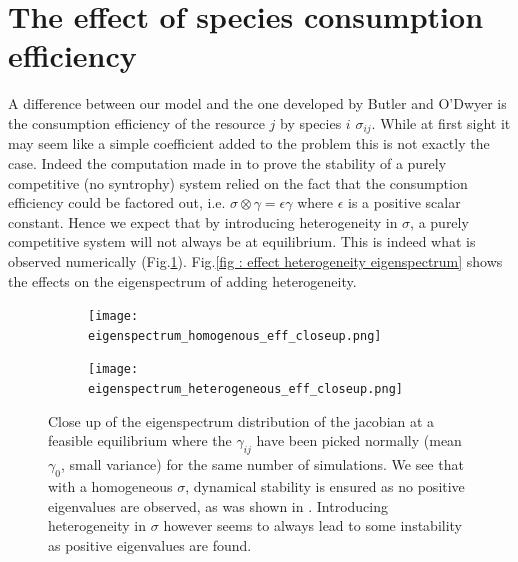 \documentclass[12pt, titlepage]{report}
\begin{document}
	\clearpage
	\section{The effect of species consumption efficiency}
	A difference between our model and the one developed by Butler and O'Dwyer \cite{Butler:2018aa} is the consumption efficiency of the resource $j$ by species $i$ $\sigma_{ij}$. While at first sight it may seem like a simple coefficient added to the problem this is not exactly the case. Indeed the computation made in \cite{Butler:2018aa} to prove the stability of a purely competitive (no syntrophy) system relied on the fact that the consumption efficiency could be factored out, i.e. $\sigma \otimes \gamma  = \epsilon \gamma$ where $\epsilon$ is a positive scalar constant. Hence we expect that by introducing heterogeneity in $\sigma$, a purely competitive system will not always be at equilibrium. This is indeed what is observed numerically (Fig.\ref{fig : effect heterogeneity stability}). Fig.\ref{fig : effect heterogeneity eigenspectrum} shows the effects on the eigenspectrum of adding heterogeneity.
	\begin{figure}[h!]
		\centering
		\begin{subfigure}{0.49\textwidth}
			\texttt{[image: eigenspectrum\_homogenous\_eff\_closeup.png]}
		\end{subfigure}
		\begin{subfigure}{0.49\textwidth}
			\texttt{[image: eigenspectrum\_heterogeneous\_eff\_closeup.png]}
		\end{subfigure}
		\caption{Close up of the eigenspectrum distribution of the jacobian at a feasible equilibrium where the $\gamma_{ij}$ have been picked normally (mean $\gamma_0$, small variance) for the same number of simulations. We see that with a homogeneous $\sigma$, dynamical stability is ensured as no positive eigenvalues are observed, as was shown in \cite{Butler:2018aa}. Introducing heterogeneity in $\sigma$ however seems to always lead to some instability as positive eigenvalues are found.}\label{fig : effect heterogeneity stability}
	\end{figure}
\end{document}
